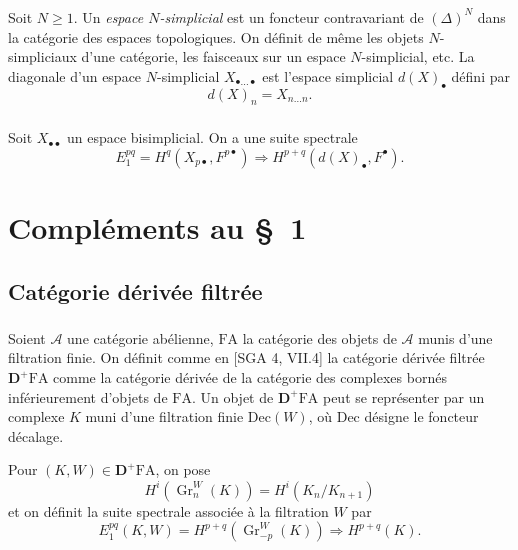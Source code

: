 \documentclass[11pt]{amsart}
\theoremstyle{plain}
\theoremstyle{definition}
\DeclareMathOperator{\Gr}{Gr}
\newcommand{\cA}{\mathcal{A}}
\newcommand{\DD}{\mathbf{D}}
\begin{document}
\subsubsection{}
Soit $N \geq 1$. Un \emph{espace $N$-simplicial} est un foncteur contravariant de $(\Delta)^N$ dans la cat\'egorie des espaces topologiques. On d\'efinit de m\^eme les objets $N$-simpliciaux d'une cat\'egorie, les faisceaux sur un espace $N$-simplicial, etc. La diagonale d'un espace $N$-simplicial $X_{\bullet \ldots \bullet}$ est l'espace simplicial $d(X)_\bullet$ d\'efini par
\[
d(X)_n = X_{n \ldots n}.
\]

\subsubsection{}
Soit $X_{\bullet \bullet}$ un espace bisimplicial. On a une suite spectrale
\begin{equation}\label{eq:6.4.2}
E_1^{pq} = H^q(X_{p \bullet}, F^{p \bullet}) \Rightarrow H^{p+q}(d(X)_\bullet, F^\bullet).
\end{equation}

\section{Compl\'ements au \S\ 1}

\subsection{Cat\'egorie d\'eriv\'ee filtr\'ee}

\subsubsection{}
Soient $\cA$ une cat\'egorie ab\'elienne, $\mathrm{FA}$ la cat\'egorie des objets de $\cA$ munis d'une filtration finie. On d\'efinit comme en [SGA 4, VII.4] la cat\'egorie d\'eriv\'ee filtr\'ee $\DD^+ \mathrm{FA}$ comme la cat\'egorie d\'eriv\'ee de la cat\'egorie des complexes born\'es inf\'erieurement d'objets de $\mathrm{FA}$. Un objet de $\DD^+ \mathrm{FA}$ peut se repr\'esenter par un complexe $K$ muni d'une filtration finie $\mathrm{Dec}(W)$, o\`u $\mathrm{Dec}$ d\'esigne le foncteur d\'ecalage.

Pour $(K, W) \in \DD^+ \mathrm{FA}$, on pose
\[
H^i(\Gr_n^W(K)) = H^i(K_n/K_{n+1})
\]
et on d\'efinit la suite spectrale associ\'ee \`a la filtration $W$ par
\[
E_1^{pq}(K, W) = H^{p+q}(\Gr_{-p}^W(K)) \Rightarrow H^{p+q}(K).
\]
\end{document}
